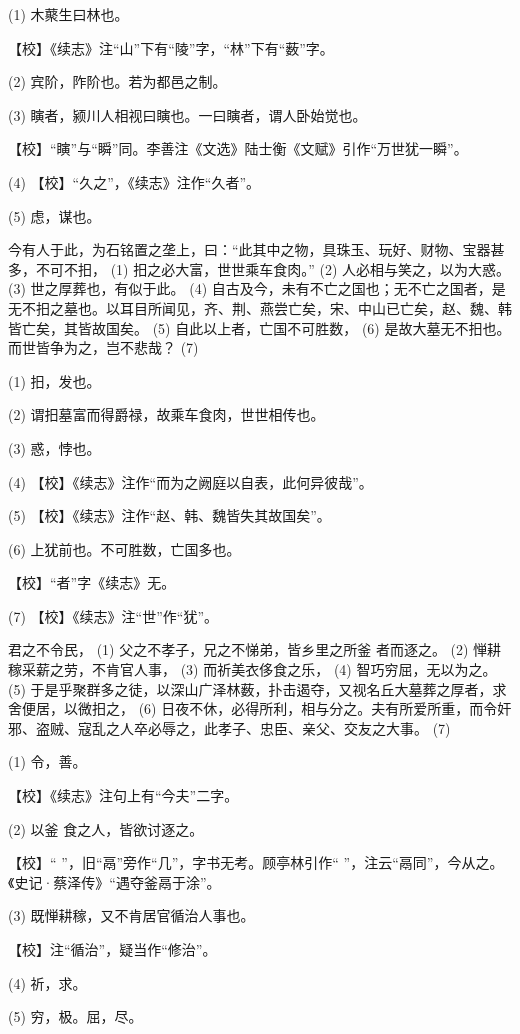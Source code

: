 \documentclass[12pt,UTF8]{ctexbook}
\begin{document}
(1) 木藂生曰林也。

【校】《续志》注“山”下有“陵”字，“林”下有“薮”字。

(2) 宾阶，阼阶也。若为都邑之制。

(3) 瞚者，颍川人相视曰瞚也。一曰瞚者，谓人卧始觉也。

【校】“瞚”与“瞬”同。李善注《文选》陆士衡《文赋》引作“万世犹一瞬”。

(4) 【校】“久之”，《续志》注作“久者”。

(5) 虑，谋也。

今有人于此，为石铭置之垄上，曰：“此其中之物，具珠玉、玩好、财物、宝器甚多，不可不抇， (1) 抇之必大富，世世乘车食肉。” (2) 人必相与笑之，以为大惑。 (3) 世之厚葬也，有似于此。 (4) 自古及今，未有不亡之国也；无不亡之国者，是无不抇之墓也。以耳目所闻见，齐、荆、燕尝亡矣，宋、中山已亡矣，赵、魏、韩皆亡矣，其皆故国矣。 (5) 自此以上者，亡国不可胜数， (6) 是故大墓无不抇也。而世皆争为之，岂不悲哉？ (7)

(1) 抇，发也。

(2) 谓抇墓富而得爵禄，故乘车食肉，世世相传也。

(3) 惑，悖也。

(4) 【校】《续志》注作“而为之阙庭以自表，此何异彼哉”。

(5) 【校】《续志》注作“赵、韩、魏皆失其故国矣”。

(6) 上犹前也。不可胜数，亡国多也。

【校】“者”字《续志》无。

(7) 【校】《续志》注“世”作“犹”。

君之不令民， (1) 父之不孝子，兄之不悌弟，皆乡里之所釜 者而逐之。 (2) 惮耕稼采薪之劳，不肯官人事， (3) 而祈美衣侈食之乐， (4) 智巧穷屈，无以为之。 (5) 于是乎聚群多之徒，以深山广泽林薮，扑击遏夺，又视名丘大墓葬之厚者，求舍便居，以微抇之， (6) 日夜不休，必得所利，相与分之。夫有所爱所重，而令奸邪、盗贼、寇乱之人卒必辱之，此孝子、忠臣、亲父、交友之大事。 (7)

(1) 令，善。

【校】《续志》注句上有“今夫”二字。

(2) 以釜 食之人，皆欲讨逐之。

【校】“ ”，旧“鬲”旁作“几”，字书无考。顾亭林引作“ ”，注云“鬲同”，今从之。《史记·蔡泽传》“遇夺釜鬲于涂”。

(3) 既惮耕稼，又不肯居官循治人事也。

【校】注“循治”，疑当作“修治”。

(4) 祈，求。

(5) 穷，极。屈，尽。
\end{document}
